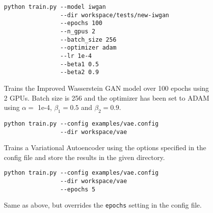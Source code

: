 \documentclass{article}
\begin{document}
\begin{flushleft}
\begin{itemize}
    \begin{figure}[H]

      \begin{verbatim}
python train.py --model iwgan
                --dir workspace/tests/new-iwgan
                --epochs 100
                --n_gpus 2
                --batch_size 256
                --optimizer adam
                --lr 1e-4
                --beta1 0.5
                --beta2 0.9
      \end{verbatim}
      \caption{Trains the Improved Wasserstein GAN model over 100 epochs using 2 GPUs. Batch size is 256 and the optimizer has been set to ADAM using $\alpha = $ 1e-4, $\beta_1 = 0.5$ and $\beta_2 = 0.9$.}
    \end{figure}

    \begin{figure}[H]
      \begin{verbatim}
python train.py --config examples/vae.config
                --dir workspace/vae
      \end{verbatim}
      \caption{Trains a Variational Autoencoder using the options specified in the config file and store the results in the given directory.}
    \end{figure}

    \begin{figure}[H]
      \begin{verbatim}
python train.py --config examples/vae.config
                --dir workspace/vae
                --epochs 5
      \end{verbatim}
      \caption{Same as above, but overrides the \texttt{epochs} setting in the config file.}
    \end{figure}



\end{itemize}
\end{flushleft}
\end{document}
